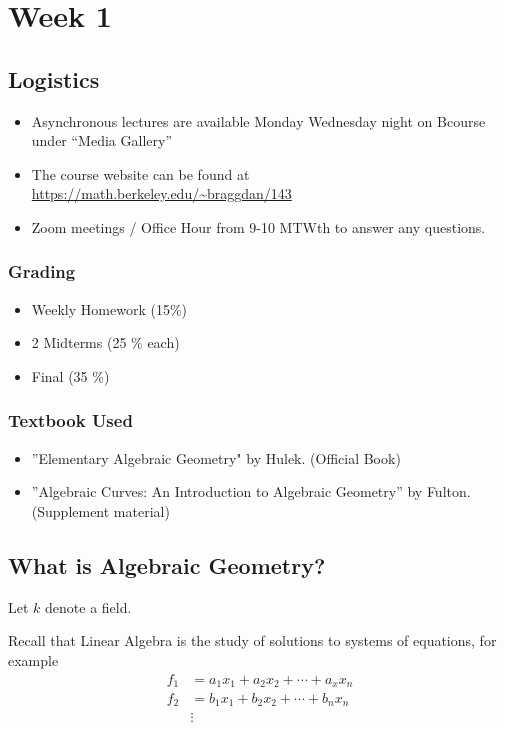 
\section{Week 1}
\subsection{Logistics}
\begin{itemize}
	\item Asynchronous lectures are available Monday Wednesday night on Bcourse under ``Media Gallery''
	\item The course website can be found at \url{https://math.berkeley.edu/~braggdan/143}
	\item Zoom meetings / Office Hour from 9-10 MTWth to answer any questions.
\end{itemize}
\subsubsection{Grading}
\begin{itemize}
	\item Weekly Homework (15\%)
	\item 2 Midterms (25 \% each)
	\item Final (35 \%)
\end{itemize}
\subsubsection{Textbook Used}
\begin{itemize}
	\item ''Elementary Algebraic Geometry" by Hulek. (Official Book)
	\item ''Algebraic Curves: An Introduction to Algebraic Geometry'' by Fulton. (Supplement material)
\end{itemize}


\subsection{What is Algebraic Geometry?}
Let $k$ denote a field. 

Recall that Linear Algebra is the study of solutions to systems of equations, for example
\begin{align*}
f_1 &= a_1x_1 + a_2x_2 + \cdots + a_x x_n \\
f_2 &= b_1x_1 + b_2x_2 + \cdots + b_n x_n \\
&\vdots
\end{align*}

